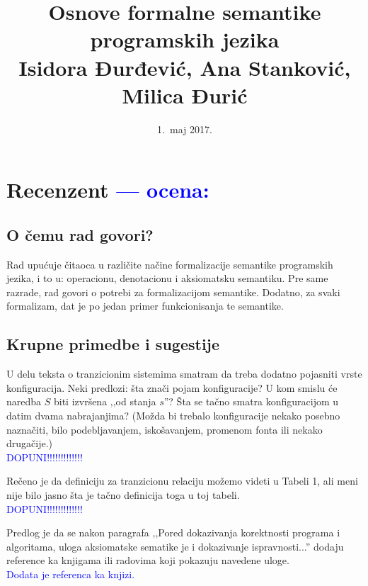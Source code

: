 \documentclass[a4paper]{report}
\newcommand{\odgovor}[1]{\textcolor{blue}{#1}}
\begin{document}
\title{Osnove formalne semantike programskih jezika\\ \small{Isidora Đurđević, Ana Stanković, Milica Đurić}}
\date{1.~maj 2017.}
\maketitle

\tableofcontents

\chapter{Recenzent \odgovor{--- ocena:}}

\section{O čemu rad govori?}

{Rad upućuje čitaoca u različite načine formalizacije semantike programskih jezika, i to u: operacionu, denotacionu i aksiomatsku semantiku. Pre same razrade, rad govori o potrebi za formalizacijom semantike. Dodatno, za svaki formalizam, dat je po jedan primer funkcionisanja te semantike.}

\section{Krupne primedbe i sugestije}

{U delu teksta o tranzicionim sistemima smatram da treba dodatno pojasniti vrste konfiguracija. Neki predlozi: šta znači pojam konfiguracije? U kom smislu će naredba $S$ biti izvršena ‚‚od stanja $s$''? Šta se tačno smatra konfiguracijom u datim dvama nabrajanjima? (Možda bi trebalo konfiguracije nekako posebno naznačiti, bilo podebljavanjem, iskošavanjem, promenom fonta ili nekako drugačije.)}\\
\odgovor{DOPUNI!!!!!!!!!!!!!}

{Rečeno je da definiciju za tranzicionu relaciju možemo videti u Tabeli 1, ali meni nije bilo jasno šta je tačno definicija toga u toj tabeli.}\\
\odgovor{DOPUNI!!!!!!!!!!!!!}

{Predlog je da se nakon paragrafa ‚‚Pored dokazivanja korektnosti programa i algoritama, uloga aksiomatske sematike je i dokazivanje ispravnosti...'' dodaju reference ka knjigama ili radovima koji pokazuju navedene uloge.}  \\
\odgovor {Dodata je referenca ka knjizi.}
	
\end{document}
